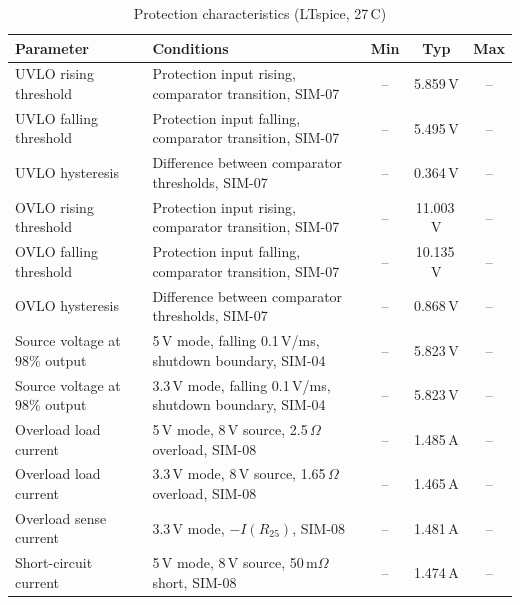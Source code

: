 \documentclass[conference]{IEEEtran}
\begin{document}
\begin{table}[t]
\centering
\footnotesize
\setlength{\tabcolsep}{4pt}
\caption{Protection characteristics (LTspice, 27\,\textdegree C)}
\label{tab:protection_characteristics}
\begin{tabularx}{\textwidth}{@{}L{4.2cm}Xccc@{}}
\toprule
\textbf{Parameter} & \textbf{Conditions} & \textbf{Min} & \textbf{Typ} & \textbf{Max} \\
\midrule

UVLO rising threshold &
Protection input rising, comparator transition, SIM-07 &
-- & 5.859\,V & -- \\

UVLO falling threshold &
Protection input falling, comparator transition, SIM-07 &
-- & 5.495\,V & -- \\

UVLO hysteresis &
Difference between comparator thresholds, SIM-07 &
-- & 0.364\,V & -- \\

OVLO rising threshold &
Protection input rising, comparator transition, SIM-07 &
-- & 11.003\,V & -- \\

OVLO falling threshold &
Protection input falling, comparator transition, SIM-07 &
-- & 10.135\,V & -- \\

OVLO hysteresis &
Difference between comparator thresholds, SIM-07 &
-- & 0.868\,V & -- \\

Source voltage at 98\% output &
5\,V mode, falling 0.1\,V/ms, shutdown boundary, SIM-04 &
-- & 5.823\,V & -- \\

Source voltage at 98\% output &
3.3\,V mode, falling 0.1\,V/ms, shutdown boundary, SIM-04 &
-- & 5.823\,V & -- \\

Overload load current &
5\,V mode, 8\,V source, 2.5\,$\Omega$ overload, SIM-08 &
-- & 1.485\,A & -- \\

Overload load current &
3.3\,V mode, 8\,V source, 1.65\,$\Omega$ overload, SIM-08 &
-- & 1.465\,A & -- \\

Overload sense current & 3.3\,V mode, $-I(R_{25})$, SIM-08 &
-- & 1.481\,A & -- \\

Short-circuit current &
5\,V mode, 8\,V source, 50\,m$\Omega$ short, SIM-08 &
-- & 1.474\,A & -- \\


\end{tabularx}
\end{table}
\end{document}
